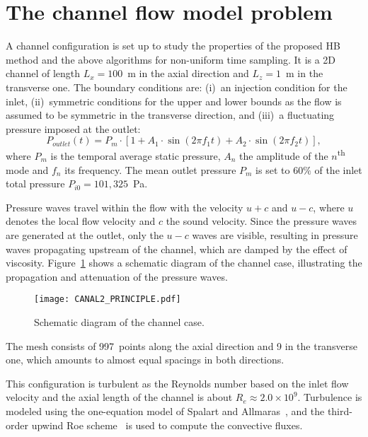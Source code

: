 
\section{The channel flow model problem}
A channel configuration is set up to study the properties of the
proposed HB method and the above algorithms for non-uniform time
sampling.  It is a 2D channel of length $L_x = 100$~m in the axial
direction and $L_z = 1$~m in the transverse one.  The boundary
conditions are: (i)~an injection condition for the inlet,
(ii)~symmetric conditions for the upper and lower bounds as the flow
is assumed to be symmetric in the transverse direction, and (iii)~a
fluctuating pressure imposed at the outlet:
\begin{equation}
  P_{outlet}(t) = P_m \cdot \left[1 + A_1 \cdot \sin(2 \pi f_1 t) +
    A_2 \cdot \sin(2 \pi f_2 t) \right],
  \label{eq:outlet_canal}
\end{equation}
where $P_m$ is the temporal average static pressure, $A_n$ the
amplitude of the $n$\textsuperscript{th} mode and $f_n$ its
frequency. The mean outlet pressure $P_m$ is set to $60\%$ of the
inlet total pressure $P_{i0} = 101,325$~Pa.

Pressure waves travel within the flow with the velocity $u + c$ and $u
- c$, where $u$ denotes the local flow velocity and $c$ the sound
velocity. Since the pressure waves are generated at the outlet, only
the $u-c$ waves are visible, resulting in pressure waves propagating
upstream of the channel, which are damped by the effect of
viscosity. Figure~\ref{fig:canal_principle} shows a schematic diagram
of the channel case, illustrating the propagation and attenuation of
the pressure waves.
\begin{figure}[htb]
  \centering
  \texttt{[image: CANAL2\_PRINCIPLE.pdf]}
  \caption{Schematic diagram of the channel case.}
  \label{fig:canal_principle}
\end{figure}

The mesh consists of 997~points along the axial direction and 9 in the
transverse one, which amounts to almost equal spacings in both
directions.

This configuration is turbulent as the Reynolds number based on the
inlet flow velocity and the axial length of the channel is about $R_e
\approx 2.0 \times 10^9$.  Turbulence is modeled using the
one-equation model of Spalart and Allmaras~\cite{Spalart1992}, and the
third-order upwind Roe scheme~\cite{Roe1981} is used to compute the
convective fluxes.